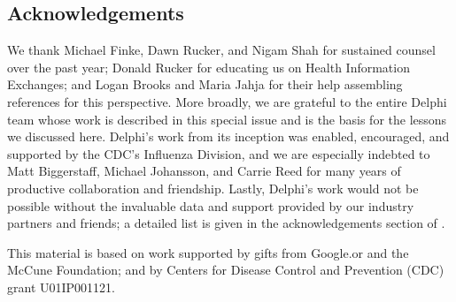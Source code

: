 \documentclass{article}
\begin{document}
\subsection*{Acknowledgements} 

We thank Michael Finke, Dawn Rucker, and Nigam Shah for sustained counsel over 
the past year; Donald Rucker for educating us on Health Information Exchanges;
and Logan Brooks and Maria Jahja for their help assembling references for this
perspective. More broadly, we are grateful to the entire Delphi team whose work
is described in this special issue and is the basis for the lessons we discussed
here. Delphi's work from its inception was enabled, encouraged, and supported by 
the CDC's Influenza Division, and we are especially indebted to Matt
Biggerstaff, Michael Johansson, and Carrie Reed for many years of productive
collaboration and friendship. Lastly, Delphi's work would not be possible
without the invaluable data and support provided by our industry partners and
friends; a detailed list is given in the acknowledgements section of
\citep{Reinhart:2021}. 

This material is based on work supported by gifts from Google.or and the McCune 
Foundation; and by Centers for Disease Control and Prevention (CDC) grant
U01IP001121.



\end{document}
